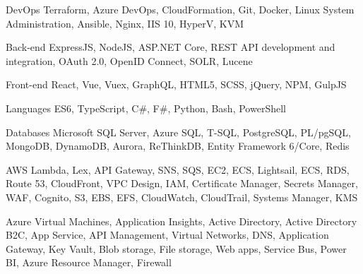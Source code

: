 

\begin{cvskills}

  \cvskill
    {DevOps} %
    {Terraform, Azure DevOps, CloudFormation, Git, Docker, Linux System Administration, Ansible, Nginx, IIS 10, HyperV, KVM} %

  \cvskill
    {Back-end} %
    {ExpressJS, NodeJS, ASP.NET Core, REST API development and integration, OAuth 2.0,  OpenID Connect, SOLR, Lucene} %

  \cvskill
    {Front-end} %
    {React, Vue, Vuex, GraphQL, HTML5, SCSS, jQuery, NPM, GulpJS} %

  \cvskill
    {Languages} %
    {ES6, TypeScript, C\#, F\#, Python, Bash, PowerShell} %

  \cvskill
    {Databases} %
    {Microsoft SQL Server, Azure SQL, T-SQL, PostgreSQL, PL/pgSQL, MongoDB, DynamoDB, Aurora, ReThinkDB, Entity Framework 6/Core, Redis} %

  \cvskill
    {AWS} %
    {Lambda, Lex, API Gateway, SNS, SQS, EC2, ECS, Lightsail, ECS, RDS, Route 53, CloudFront, VPC Design, IAM, Certificate Manager, Secrets Manager, WAF, Cognito, S3, EBS, EFS, CloudWatch, CloudTrail, Systems Manager, KMS } %

  \cvskill
    {Azure} %
    {Virtual Machines, Application Insights, Active Directory, Active Directory B2C, App Service, API Management, Virtual Networks, DNS, Application Gateway, Key Vault, Blob storage, File storage, Web apps, Service Bus, Power BI, Azure Resource Manager, Firewall} %


\end{cvskills}
